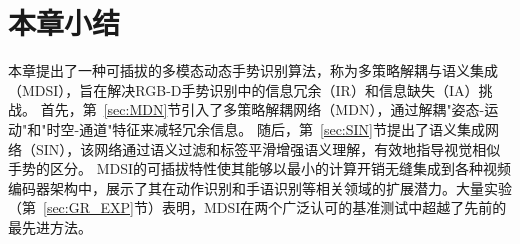 \section{本章小结}
本章提出了一种可插拔的多模态动态手势识别算法，称为多策略解耦与语义集成（MDSI），旨在解决RGB-D手势识别中的信息冗余（IR）和信息缺失（IA）挑战。
首先，第~\ref{sec:MDN}节引入了多策略解耦网络（MDN），通过解耦"姿态-运动"和"时空-通道"特征来减轻冗余信息。
随后，第~\ref{sec:SIN}节提出了语义集成网络（SIN），该网络通过语义过滤和标签平滑增强语义理解，有效地指导视觉相似手势的区分。
MDSI的可插拔特性使其能够以最小的计算开销无缝集成到各种视频编码器架构中，展示了其在动作识别和手语识别等相关领域的扩展潜力。大量实验（第~\ref{sec:GR_EXP}节）表明，MDSI在两个广泛认可的基准测试中超越了先前的最先进方法。




